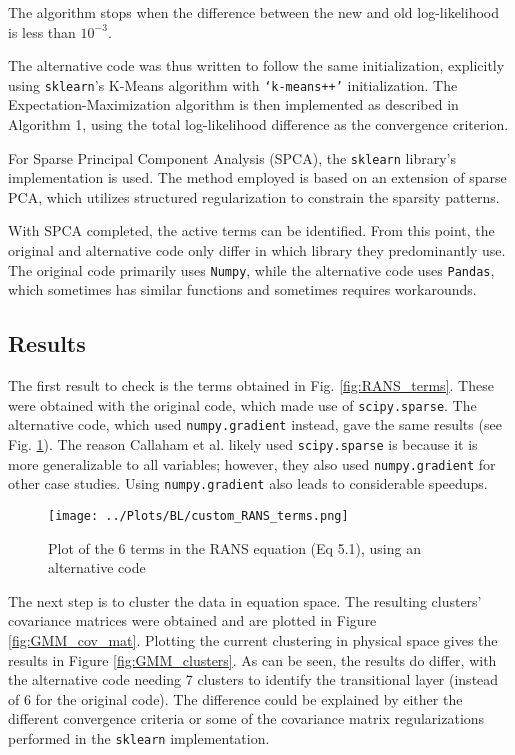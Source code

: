 \documentclass[12pt]{report} %
\begin{document}
The algorithm stops when the difference between the new and old log-likelihood is less than $10^{-3}$.

The alternative code was thus written to follow the same initialization, explicitly using \texttt{sklearn}’s K-Means algorithm with \texttt{‘k-means++’} initialization. The Expectation-Maximization algorithm is then implemented as described in Algorithm 1, using the total log-likelihood difference as the convergence criterion.

For Sparse Principal Component Analysis (SPCA), the \texttt{sklearn} library’s implementation is used. The method employed is based on an extension of sparse PCA, which utilizes structured regularization to constrain the sparsity patterns.

With SPCA completed, the active terms can be identified. From this point, the original and alternative code only differ in which library they predominantly use. The original code primarily uses \texttt{Numpy}, while the alternative code uses \texttt{Pandas}, which sometimes has similar functions and sometimes requires workarounds.


\subsection{Results}

The first result to check is the terms obtained in Fig. \ref{fig:RANS_terms}. These were obtained with the original code, which made use of \texttt{scipy.sparse}. The alternative code, which used \texttt{numpy.gradient} instead, gave the same results (see Fig. \ref{fig:custom_RANS_terms}). The reason Callaham et al. likely used \texttt{scipy.sparse} is because it is more generalizable to all variables; however, they also used \texttt{numpy.gradient} for other case studies. Using \texttt{numpy.gradient} also leads to considerable speedups.

\begin{figure}[htbp]
  \centering
  \texttt{[image: ../Plots/BL/custom\_RANS\_terms.png]}
  \caption{Plot of the 6 terms in the RANS equation (Eq 5.1), using an alternative code}
  \label{fig:custom_RANS_terms}
\end{figure}

\newpage

The next step is to cluster the data in equation space. The resulting clusters’ covariance matrices were obtained and are plotted in Figure \ref{fig:GMM_cov_mat}. Plotting the current clustering in physical space gives the results in Figure \ref{fig:GMM_clusters}. As can be seen, the results do differ, with the alternative code needing 7 clusters to identify the transitional layer (instead of 6 for the original code). The difference could be explained by either the different convergence criteria or some of the covariance matrix regularizations performed in the \texttt{sklearn} implementation\cite{sklearnGMM}.
\end{document}
